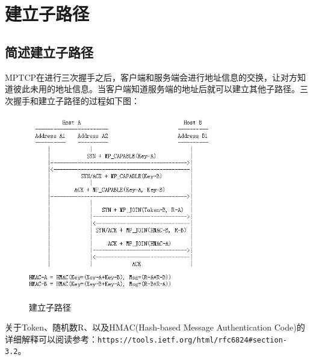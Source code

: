 \section{建立子路径}
\subsection{简述建立子路径}
MPTCP在进行三次握手之后，客户端和服务端会进行地址信息的交换，让对方知道彼此未用的地址信息。当客户端知道服务端的地址后就可以建立其他子路径。三次握手和建立子路径的过程如下图：
\begin{figure}[H]
  \centering
  \includegraphics[width=8cm]{dias/Create_Subflows.jpg}\\
  \caption{建立子路径}
\end{figure}

关于Token、随机数R、以及HMAC(Hash-based Message Authentication Code)的详细解释可以阅读参考：\verb|https://tools.ietf.org/html/rfc6824#section-3.2|。

